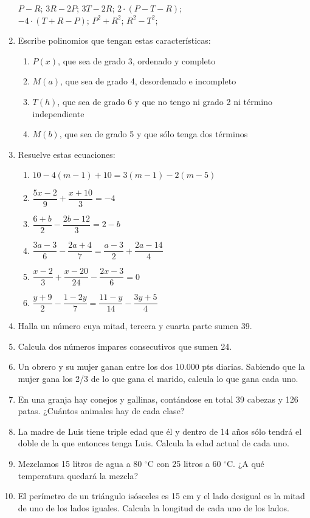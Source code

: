 \documentclass[10pt,twoside]{article}
\begin{document}
\begin{enumerate}
\begin{tabbing}
 $P-R$; \> $3R-2P$; \> $3T-2R$; \> $2\cdot (P-T-R)$; \\
 $-4\cdot (T+R-P)$; \> $P^{2}+R^{2}$; \> $R^{2}-T^{2}$;\>
\end{tabbing}
\item Escribe polinomios que tengan estas características:
\begin{enumerate}
 \item $P(x)$, que sea de grado 3, ordenado y completo
 \item $M(a)$, que sea de grado 4, desordenado e incompleto
 \item $T(h)$, que sea de grado 6 y que no tengo ni grado 2 ni término independiente
 \item $M(b)$, que sea de grado 5 y que sólo tenga dos términos
\end{enumerate}
\item Resuelve estas ecuaciones:
\begin{enumerate}
 \item $10-4(m-1)+10=3(m-1)-2(m-5)$
 \item $\dfrac{5x-2}{9}+\dfrac{x+10}{3}=-4$
 \item $\dfrac{6+b}{2}-\dfrac{2b-12}{3}=2-b$
 \item $\dfrac{3a-3}{6}-\dfrac{2a+4}{7}=\dfrac{a-3}{2}+\dfrac{2a-14}{4}$
 \item $\dfrac{x-2}{3}+\dfrac{x-20}{24}-\dfrac{2x-3}{6}=0$
 \item $\dfrac{y+9}{2}-\dfrac{1-2y}{7}=\dfrac{11-y}{14}-\dfrac{3y+5}{4}$
\end{enumerate}
\item Halla un número cuya mitad, tercera y cuarta parte sumen 39.
\item Calcula dos números impares consecutivos que sumen 24.
\item Un obrero y su mujer ganan entre los dos 10.000 pts diarias. Sabiendo que la mujer gana los 2/3 de lo que gana el marido, calcula lo que gana cada uno.
\item En una granja hay conejos y gallinas, contándose en total 39 cabezas y 126 patas. ¿Cuántos animales hay de cada clase?
\item La madre de Luis tiene triple edad que él y dentro de 14 años sólo tendrá el doble de la que entonces tenga Luis. Calcula la edad actual de cada uno.
\item Mezclamos 15 litros de agua a 80 $^{\circ}$C con 25 litros a 60 $^{\circ}$C. ¿A qué temperatura quedará la mezcla?
\item El perímetro de un triángulo isósceles es 15 cm y el lado desigual es la mitad de uno de los lados iguales. Calcula la longitud de cada uno de los lados.
\end{enumerate}
\end{document}
